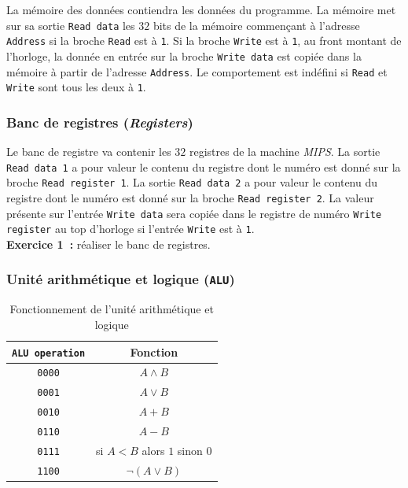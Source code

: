 \documentclass[12pt]{article}
\begin{document}
La mémoire des données contiendra les données du programme. La mémoire met sur sa sortie \verb+Read data+ les $32$ bits de la mémoire
commençant à l'adresse \verb+Address+ si la broche \verb+Read+ est à \verb+1+. Si la broche \verb+Write+ est à \verb+1+, au front montant
de l'horloge, la donnée en entrée sur la broche \verb+Write data+ est copiée dans la mémoire à partir de l'adresse \verb+Address+. Le
comportement est indéfini si \verb+Read+ et \verb+Write+ sont tous les deux à \verb+1+.

\subsubsection{Banc de registres (\emph{Registers})}

Le banc de registre va contenir les $32$ registres de la machine \emph{MIPS}. La sortie \verb+Read data 1+ a pour valeur le contenu du registre
dont le numéro est donné sur la broche \verb+Read register 1+. La sortie \verb+Read data 2+ a pour valeur le contenu du registre
dont le numéro est donné sur la broche \verb+Read register 2+. La valeur présente sur l'entrée \verb+Write data+ sera copiée dans le
registre de numéro \verb+Write register+ au top d'horloge si l'entrée \verb+Write+ est à \verb+1+.\\

\textbf{Exercice 1~:} réaliser le banc de registres.

\subsubsection{Unité arithmétique et logique (\texttt{ALU})}

\begin{table}[!htpb]
\begin{center}
\begin{tabular}{|c|c|}
\hline
\verb+ALU operation+ & Fonction\\
\hline
\hline
\verb+0000+ & $A\wedge B$\\
\hline
\verb+0001+ & $A\vee B$\\
\hline
\verb+0010+ & $A+B$\\
\hline
\verb+0110+ & $A-B$\\
\hline
\verb+0111+ & si $A < B$ alors $1$ sinon $0$\\
\hline
\verb+1100+ & $\neg(A \vee B)$\\
\hline
\end{tabular}
\end{center}
\caption{Fonctionnement de l'unité arithmétique et logique}
\label{table:alu}
\end{table}
\end{document}
